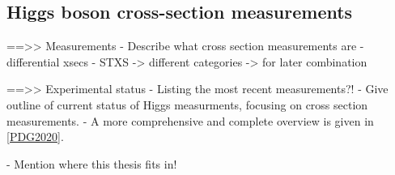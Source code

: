 

\subsection{Higgs boson cross-section measurements}


==>> Measurements
- Describe what cross section measurements are 
- differential xsecs
- STXS -> different categories -> for later combination

==>> Experimental status
- Listing the most recent measurements?!
- Give outline of current status of Higgs measurments, focusing on cross section measurements.
- A more comprehensive and complete overview is given in \cref{PDG2020}.

- Mention where this thesis fits in!





